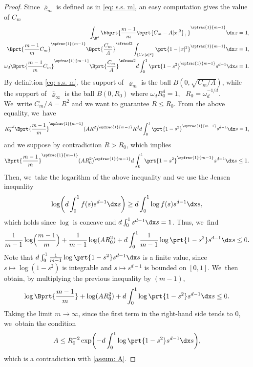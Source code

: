 \begin{proof}
Since $\bar\varrho_m$ is defined as in \eqref{eq: s.s. m}, an easy computation gives the value of $C_m$
\begin{equation*}
\begin{aligned}
\int_{\R^d}\bbprt{{\frac{m-1}{m}}\bprt{C_m - A |x|^2}_+}^{\spfrac{1}{m-1}} \dx x&= 1,\\
\Bprt{\frac{m-1}{m} C_m}^{\spfrac{1}{m-1}} \Bprt{\frac{C_m}{A}}^{\sfrac d 2}\int_{\{1>|x|^2\}}\prt{1- |x|^2}^{\spfrac{1}{m-1}} \dx x&= 1,\\
\omega_d\Bprt{\frac{m-1}{m} C_m}^{\spfrac{1}{m-1}} \Bprt{\frac{C_m}{A}}^{\sfrac d 2}{ d}\int_0^1\prt{1- s^2}^{\spfrac{1}{m-1}} s^{d-1}\dx s&= 1.
\end{aligned}
\end{equation*}
By definition \eqref{eq: s.s. m}, the support of~$\bar \varrho_m$ is the ball $B(0,\sqrt{C_m/A})$, while the support of~$\bar \varrho_\infty$ is the ball $B(0,R_0)$ where $\omega_dR_0^d=1$, \ie \ $R_0=\omega_d^{-1/d}$. We~write $C_m/A=R^2$ and we want to guarantee $R\leq R_0$.
From the above equality, we~have
\[
R_0^{-d} \Bprt{\frac{m-1}{m}}^{\spfrac{1}{m-1}} (AR^2)^{\spfrac{1}{m-1}}R^d{ d}\int_0^1\prt{1- s^2}^{\spfrac{1}{m-1}} s^{d-1}\dx s= 1,
\]
and we suppose by contradiction $R>R_0$, which implies
\[
\Bprt{\frac{m-1}{m}}^{\spfrac{1}{m-1}} (AR_0^2)^{\spfrac{1}{m-1}}{ d}\int_0^1\prt{1- s^2}^{\spfrac{1}{m-1}} s^{d-1}\dx s\leq 1.
\]
Then, we~take the logarithm of the above inequality and we use the Jensen inequality
\[
\log \biggl({ d}\int_0^1 f(s)s^{d-1}\dx s\biggr)\geq{ d}\int_0^1\log f(s) s^{d-1}\dx s,
\]
which holds since $\log$ is concave and ${ d}\int_0^1 s^{d-1}\dx s=1$. Thus, we~find
\[
\frac{1}{m-1}\log\Bigl(\frac{m-1}{m}\Bigr)+ \frac{1}{m-1}\log (AR_0^2)+{ d}\int_0^1 \frac{1}{m-1}\log\prt{1- s^2} s^{d-1}\dx s\leq 0.
\]
Note that ${ d}\int_0^1 \frac{1}{m-1}\log\prt{1- s^2} s^{d-1}\dx s$ is a finite value, since $s\mapsto\log(1-s^{2})$ is integrable and $s\mapsto s^{d-1}$ is bounded on $[0,1]$. We~then obtain, by multiplying the previous inequality by $(m-1),$
\[
\log\Bprt{\frac{m-1}{m}}+ \log (AR_0^2)+{ d}\int_0^1 \log\prt{1- s^2} s^{d-1}\dx s\leq 0.
\]
Taking the limit $m\to\infty$, since the first term in the right-hand side tends to $0$, we~obtain the condition
\[
A\leq R_0^{-2}\exp\biggl(-{ d}\int_0^1 \log\prt{1- s^2} s^{d-1}\dx s\biggr),
\]
which is a contradiction with \eqref{assum: A}.
\end{proof}
